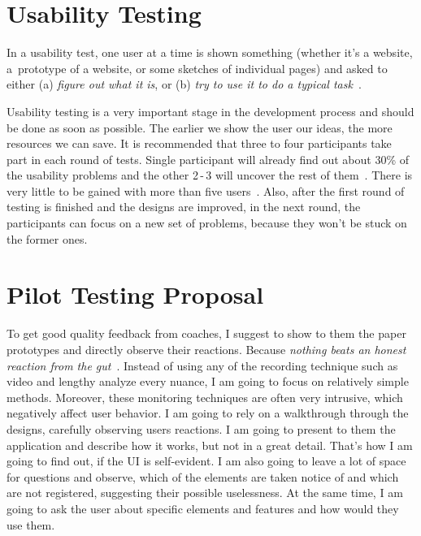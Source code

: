 \section{Usability Testing}
In a usability test, one user at a time is shown something (whether it’s a website, a~prototype of a website, or some sketches of individual pages) and asked to either (a) \textit{figure out what it is}, or (b) \textit{try to use it to do a typical task}~\cite{Krug}.

Usability testing is a very important stage in the development process and should be done as soon as possible. The earlier we show the user our ideas, the more resources we can save. It is recommended that three to four participants take part in each round of tests. Single participant will already find out about 30\% of the usability problems and the other 2\,-\,3 will uncover the rest of them~\cite{Dix}. There is very little to be gained with more than five users~\cite{Krug}. Also, after the first round of testing is finished and the designs are improved, in the next round, the participants can focus on a new set of problems, because they won’t be stuck on the former ones.


\section{Pilot Testing Proposal}
To get good quality feedback from coaches, I suggest to show to them the paper prototypes and directly observe their reactions. Because \textit{nothing beats an honest reaction from the gut}~\cite{McCue}. Instead of using any of the recording technique such as video and lengthy analyze every nuance, I am going to focus on relatively simple methods. Moreover, these monitoring techniques are often very intrusive, which negatively affect user behavior. I am going to rely on a walkthrough through the designs, carefully observing users reactions. I am going to present to them the application and describe how it works, but not in a great detail. That’s how I am going to find out, if the UI is self-evident. I am also going to leave a lot of space for questions and observe, which of the elements are taken notice of and which are not registered, suggesting their possible uselessness. At the same time, I am going to ask the user about specific elements and features and how would they use them.

